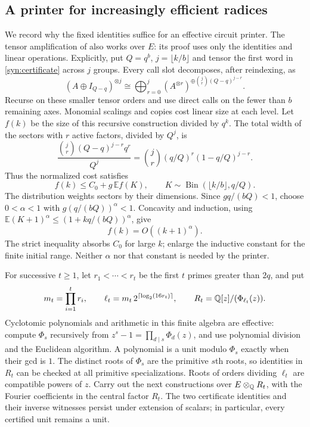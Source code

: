 \subsection{A printer for increasingly efficient radices}

We record why the fixed identities suffice for an effective circuit
printer.  The tensor amplification of \cite[Lemma~2.3]{exactfourier}
also works over $E$: its proof uses only the identities and linear
operations.  Explicitly, put $Q=q^b$, $j=\lfloor k/b\rfloor$ and
tensor the first word in \eqref{syn:certificate} across $j$ groups.
Every call slot decomposes, after reindexing, as
\[
 (A\oplus I_{Q-q})^{\otimes j}
 \cong\bigoplus_{r=0}^j
 (A^{\otimes r})^{\oplus\binom jr(Q-q)^{j-r}}.
\]
Recurse on these smaller tensor orders and use direct calls on the
fewer than $b$ remaining axes.  Monomial scalings and copies cost
linear size at each level.  Let $f(k)$ be the size of this recursive
construction divided by $q^k$.  The total width of the sectors with
$r$ active factors, divided by $Q^j$, is
\[
 \frac{\binom jr(Q-q)^{j-r}q^r}{Q^j}
 =\binom jr(q/Q)^r(1-q/Q)^{j-r}.
\]
Thus the normalized cost satisfies
\[
 f(k)\le C_0+g\,\mathbb E f(K),\qquad
 K\sim\operatorname{Bin}(\lfloor k/b\rfloor,q/Q).
\]
The distribution weights sectors by their dimensions.  Since
$gq/(bQ)<1$, choose $0<\alpha<1$ with
$g(q/(bQ))^\alpha<1$.  Concavity and induction, using
$\mathbb E(K+1)^\alpha\le(1+kq/(bQ))^\alpha$, give
\begin{equation}\label{syn:amplification}
 f(k)=O((k+1)^\alpha).
\end{equation}
The strict inequality absorbs $C_0$ for large $k$; enlarge the
inductive constant for the finite initial range.  Neither $\alpha$
nor that constant is needed by the printer.

For successive $t\ge1$, let $r_1<\cdots<r_t$ be the first $t$ primes
greater than $2q$, and put
\[
 m_t=\prod_{i=1}^t r_i,\qquad
 \ell_t=m_t\,2^{\lceil\log_2(16r_t)\rceil},\qquad
 R_t=\mathbb Q[z]/(\Phi_{\ell_t}(z)).
\]
Cyclotomic polynomials and arithmetic in this finite algebra are
effective: compute $\Phi_s$ recursively from
$z^s-1=\prod_{d\mid s}\Phi_d(z)$, and use polynomial division and
the Euclidean algorithm.  A polynomial is a unit modulo $\Phi_s$
exactly when their gcd is $1$.  The distinct roots of $\Phi_s$ are
the primitive $s$th roots, so identities in $R_t$ can be checked at
all primitive specializations.  Roots of orders dividing $\ell_t$
are compatible powers of $z$.
Carry out the next constructions over $E\otimes_{\mathbb Q}R_t$, with the
Fourier coefficients in the central factor $R_t$.  The two certificate
identities and their inverse witnesses persist under extension of
scalars; in particular, every certified unit remains a unit.

